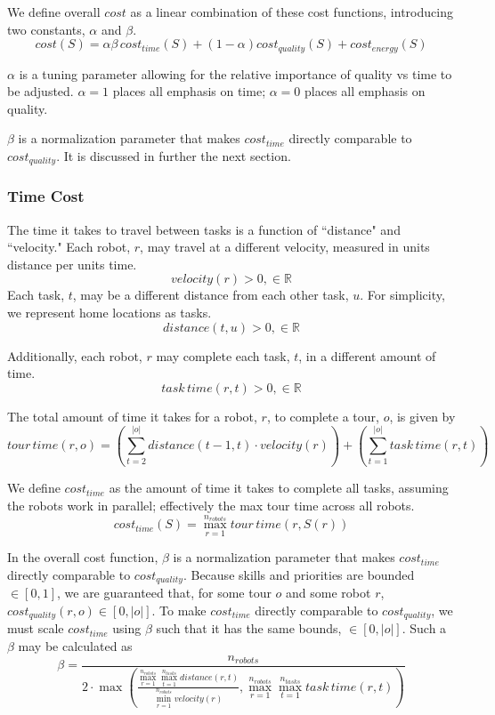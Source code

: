 \documentclass[a4paper]{article}
\begin{document}
We define overall $\mathit{cost}$ as a linear combination of these cost functions, introducing two constants, $\alpha$ and $\beta$.
$$
\mathit{cost}(S) =
  \alpha \beta \, \mathit{cost}_\mathit{time}(S) +
  (1-\alpha) \mathit{cost}_\mathit{quality}(S) +
  \mathit{cost}_\mathit{energy}(S)
$$

$\alpha$ is a tuning parameter allowing for the relative importance of quality vs time to be adjusted. $\alpha = 1$ places all emphasis on time; $\alpha = 0$ places all emphasis on quality.

$\beta$ is a normalization parameter that makes $\mathit{cost}_\mathit{time}$ directly comparable to $\mathit{cost}_\mathit{quality}$. It is discussed in further the next section.

\subsubsection{Time Cost}

The time it takes to travel between tasks is a function of ``distance" and ``velocity." Each robot, $r$, may travel at a different velocity, measured in units distance per units time.
$$\mathit{velocity}(r) > 0, \in \mathbb{R}$$
Each task, $t$, may be a different distance from each other task, $u$. For simplicity, we represent home locations as tasks.
$$\mathit{distance}(t, u) > 0, \in \mathbb{R}$$

Additionally, each robot, $r$ may complete each task, $t$, in a different amount of time.
$$\mathit{task \, time}(r, t) > 0, \in \mathbb{R}$$

The total amount of time it takes for a robot, $r$, to complete a tour, $o$, is given by
$$
\mathit{tour \, time}(r, o) =
  \left(
    \sum^{|o|}_{t=2} \mathit{distance}(t - 1, t) \cdot \mathit{velocity}(r)
  \right) +
  \left(
    \sum^{|o|}_{t=1} \mathit{task \, time}(r, t)
  \right)
$$

We define $\mathit{cost}_\mathit{time}$ as the amount of time it takes to complete all tasks, assuming the robots work in parallel; effectively the max tour time across all robots.
$$
\mathit{cost}_\mathit{time}(S) =
  \max_{r=1}^{n_\mathit{robots}}
  \mathit{tour \, time}(r, S(r))
$$

In the overall cost function, $\beta$ is a normalization parameter that makes $\mathit{cost}_\mathit{time}$ directly comparable to $\mathit{cost}_\mathit{quality}$. Because skills and priorities are bounded $\in [0, 1]$, we are guaranteed that, for some tour $o$ and some robot $r$, $\mathit{cost}_\mathit{quality}(r, o) \in [0, |o|]$. To make $\mathit{cost}_\mathit{time}$ directly comparable to $\mathit{cost}_\mathit{quality}$, we must scale $\mathit{cost}_\mathit{time}$ using $\beta$ such that it has the same bounds, $\in [0, |o|]$. Such a $\beta$ may be calculated as
$$
\beta =
    \frac
      {n_\textit{robots}}
      {
        2 \cdot
        \max \left(
          \frac
            { \max\limits_{r=1}^{n_\mathit{robots}} \max\limits_{t=1}^{n_\mathit{tasks}} \mathit{distance}(r, t) }
            { \min\limits_{r=1}^{n_\mathit{robots}} \mathit{velocity}(r) },
          \max\limits_{r=1}^{n_\mathit{robots}} \max\limits_{t=1}^{n_\mathit{tasks}} \mathit{task \, time}(r, t)
        \right)
      }
$$
\end{document}
